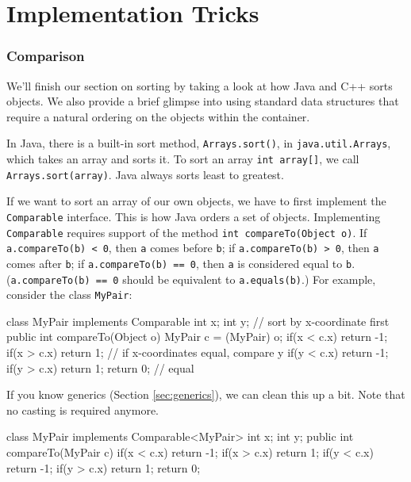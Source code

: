 \chapter{Implementation Tricks}

\subsection{Comparison}

We'll finish our section on sorting by taking a look at how Java and C++ sorts objects. We also provide a brief glimpse into using standard data structures that require a natural ordering on the objects within the container.

In Java, there is a built-in sort method, \texttt{Arrays.sort()}, in \texttt{java.util.Arrays}, which takes an array and sorts it. To sort an array \texttt{int array[]}, we call \texttt{Arrays.sort(array)}. Java always sorts least to greatest.

If we want to sort an array of our own objects, we have to first implement the \texttt{Comparable} interface. This is how Java orders a set of objects. Implementing \texttt{Comparable} requires support of the method \texttt{int compareTo(Object o)}. If \texttt{a.compareTo(b) < 0}, then \texttt{a} comes before \texttt{b}; if \texttt{a.compareTo(b) > 0}, then \texttt{a} comes after \texttt{b}; if \texttt{a.compareTo(b) == 0}, then \texttt{a} is considered equal to \texttt{b}. (\texttt{a.compareTo(b) == 0} should be equivalent to \texttt{a.equals(b)}.) For example, consider the class \texttt{MyPair}:

\begin{mylstlisting}
class MyPair implements Comparable {
	int x;
	int y;
    // sort by x-coordinate first
	public int compareTo(Object o) {
		MyPair c = (MyPair) o;
		if(x < c.x) return -1;
		if(x > c.x) return 1;
		// if x-coordinates equal, compare y
		if(y < c.x) return -1;
		if(y > c.x) return 1;
		return 0; // equal
	}
}
\end{mylstlisting}

If you know generics (Section \ref{sec:generics}), we can clean this up a bit. Note that no casting is required anymore.

\begin{mylstlisting}
class MyPair implements Comparable<MyPair> {
	int x;
	int y;
	public int compareTo(MyPair c) {
		if(x < c.x) return -1;
		if(x > c.x) return 1;
		if(y < c.x) return -1;
		if(y > c.x) return 1;
		return 0;
	}
}
\end{mylstlisting}

